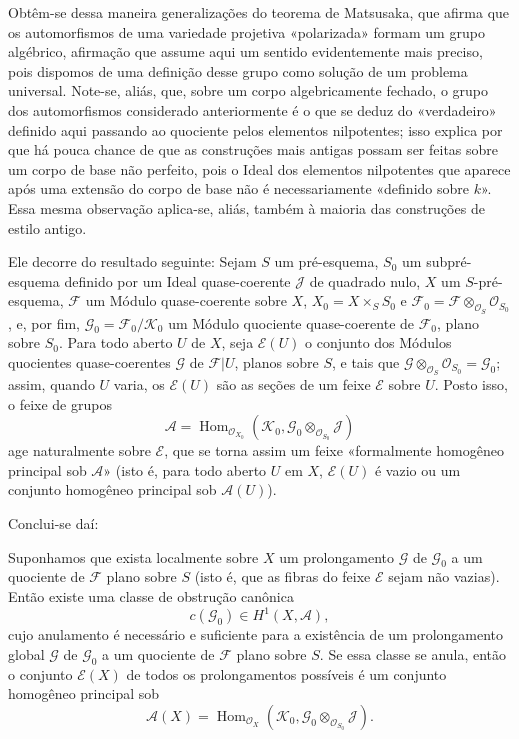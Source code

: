Obtêm-se dessa maneira generalizações do teorema de Matsusaka, que afirma
que os automorfismos de uma variedade projetiva «polarizada» formam um grupo
algébrico, afirmação que assume aqui um sentido evidentemente mais preciso,
pois dispomos de uma definição desse grupo como solução de um problema
universal. Note-se, aliás, que, sobre um corpo algebricamente fechado, o grupo
dos automorfismos considerado anteriormente é o que se deduz do «verdadeiro»
definido aqui passando ao quociente pelos elementos nilpotentes; isso explica
por que há pouca chance de que as construções mais antigas possam ser feitas
sobre um corpo de base não perfeito, pois o Ideal dos elementos nilpotentes que
aparece após uma extensão do corpo de base não é necessariamente «definido
sobre $k$». Essa mesma observação aplica-se, aliás, também à maioria das construções
de estilo antigo.


Ele decorre do resultado seguinte:
 Sejam $S$ um pré-esquema, $S_0$ um subpré-esquema
definido por um Ideal quase-coerente $\mathcal J$ de quadrado nulo, $X$ um
$S$-pré-esquema, $\mathcal F$ um Módulo quase-coerente sobre $X$,
$X_0=X\times_SS_0$ e
$\mathcal F_0=\mathcal F\otimes_{\mathcal O_S}\mathcal O_{S_0}$, e, por fim,
$\mathcal G_0=\mathcal F_0/\mathcal K_0$ um Módulo quociente quase-coerente de
$\mathcal F_0$, plano sobre $S_0$. Para todo aberto $U$ de $X$, seja
$\mathcal E(U)$ o conjunto dos Módulos quocientes quase-coerentes $\mathcal G$ de
$\mathcal F|U$, planos sobre $S$, e tais que
$\mathcal G\otimes_{\mathcal O_S}\mathcal O_{S_0}=\mathcal G_0$; assim, quando
$U$ varia, os $\mathcal E(U)$ são as seções de um feixe $\mathcal E$ sobre
$U$. Posto isso, o feixe de grupos
\[
\mathcal A=\operatorname{Hom}_{\mathcal O_{X_0}}
(\mathcal K_0,\mathcal G_0\otimes_{\mathcal O_{S_0}}\mathcal J)
\]
age naturalmente sobre $\mathcal E$, que se torna assim um feixe
«formalmente homogêneo principal sob $\mathcal A$» (isto é, para todo aberto
$U$ em $X$, $\mathcal E(U)$ é vazio ou um conjunto homogêneo principal sob
$\mathcal A(U)$).

Conclui-se daí:

 Suponhamos que exista localmente sobre $X$ um
prolongamento $\mathcal G$ de $\mathcal G_0$ a um quociente de $\mathcal F$
plano sobre $S$ (isto é, que as fibras do feixe $\mathcal E$ sejam não vazias).
Então existe uma classe de obstrução canônica
\[
c(\mathcal G_0)\in H^1(X,\mathcal A),
\]
cujo anulamento é necessário e suficiente para a existência de um
prolongamento global $\mathcal G$ de $\mathcal G_0$ a um quociente de
$\mathcal F$ plano sobre $S$. Se essa classe se anula, então o conjunto
$\mathcal E(X)$ de todos os prolongamentos possíveis é um conjunto homogêneo
principal sob
\[
\mathcal A(X)=\operatorname{Hom}_{\mathcal O_X}
(\mathcal K_0,\mathcal G_0\otimes_{\mathcal O_{S_0}}\mathcal J).
\]

